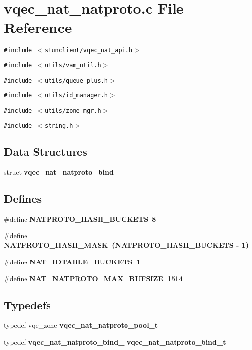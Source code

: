 \section{vqec\_\-nat\_\-natproto.c File Reference}
\label{vqec__nat__natproto_8c}
{\tt \#include $<$stunclient/vqec\_\-nat\_\-api.h$>$}\par
{\tt \#include $<$utils/vam\_\-util.h$>$}\par
{\tt \#include $<$utils/queue\_\-plus.h$>$}\par
{\tt \#include $<$utils/id\_\-manager.h$>$}\par
{\tt \#include $<$utils/zone\_\-mgr.h$>$}\par
{\tt \#include $<$string.h$>$}\par
\subsection*{Data Structures}
\begin{CompactItemize}
\item 
struct \bf{vqec\_\-nat\_\-natproto\_\-bind\_\-}
\end{CompactItemize}
\subsection*{Defines}
\begin{CompactItemize}
\item 
\#define \bf{NATPROTO\_\-HASH\_\-BUCKETS}~8
\item 
\#define \bf{NATPROTO\_\-HASH\_\-MASK}~(NATPROTO\_\-HASH\_\-BUCKETS - 1)
\item 
\#define \bf{NAT\_\-IDTABLE\_\-BUCKETS}~1
\item 
\#define \bf{NAT\_\-NATPROTO\_\-MAX\_\-BUFSIZE}~1514
\end{CompactItemize}
\subsection*{Typedefs}
\begin{CompactItemize}
\item 
typedef vqe\_\-zone \bf{vqec\_\-nat\_\-natproto\_\-pool\_\-t}
\item 
typedef \bf{vqec\_\-nat\_\-natproto\_\-bind\_\-} \bf{vqec\_\-nat\_\-natproto\_\-bind\_\-t}
\end{CompactItemize}
